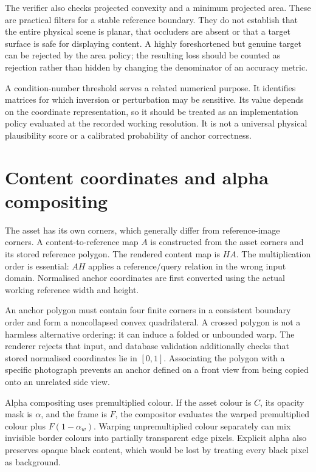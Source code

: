 The verifier also checks projected convexity and a minimum projected area. These are practical filters for a stable reference boundary. They do not establish that the entire physical scene is planar, that occluders are absent or that a target surface is safe for displaying content. A highly foreshortened but genuine target can be rejected by the area policy; the resulting loss should be counted as rejection rather than hidden by changing the denominator of an accuracy metric.

A condition-number threshold serves a related numerical purpose. It identifies matrices for which inversion or perturbation may be sensitive. Its value depends on the coordinate representation, so it should be treated as an implementation policy evaluated at the recorded working resolution. It is not a universal physical plausibility score or a calibrated probability of anchor correctness.

\section{Content coordinates and alpha compositing}
The asset has its own corners, which generally differ from reference-image corners. A content-to-reference map $A$ is constructed from the asset corners and its stored reference polygon. The rendered content map is $HA$. The multiplication order is essential: $AH$ applies a reference/query relation in the wrong input domain. Normalised anchor coordinates are first converted using the actual working reference width and height.

An anchor polygon must contain four finite corners in a consistent boundary order and form a noncollapsed convex quadrilateral. A crossed polygon is not a harmless alternative ordering: it can induce a folded or unbounded warp. The renderer rejects that input, and database validation additionally checks that stored normalised coordinates lie in $[0,1]$. Associating the polygon with a specific photograph prevents an anchor defined on a front view from being copied onto an unrelated side view.

Alpha compositing uses premultiplied colour. If the asset colour is $C$, its opacity mask is $\alpha$, and the frame is $F$, the compositor evaluates the warped premultiplied colour plus $F(1-\alpha_w)$. Warping unpremultiplied colour separately can mix invisible border colours into partially transparent edge pixels. Explicit alpha also preserves opaque black content, which would be lost by treating every black pixel as background.

